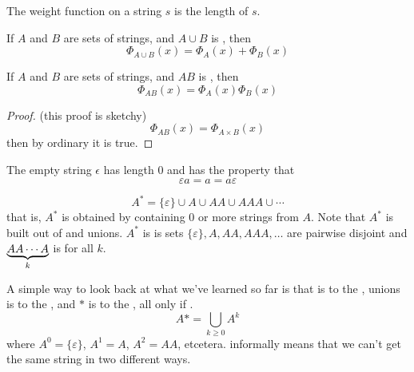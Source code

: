 \documentclass[english, 11pt]{article}
\begin{document}
\begin{exmp}
     \begin{defn}\label{weight function on strings}
     The weight function on a string $s$ is the length of $s$.
     \end{defn}

     \begin{thrm}\label{sum lemma on strings}
     If $A$ and $B$ are sets of strings, and $A \cup B$ is , then
     \[ \Phi_{A \cup B}(x) = \Phi_A(x) + \Phi_B(x) \]
     \end{thrm}

     \begin{thrm}\label{product lemma on strings}
     If $A$ and $B$ are sets of strings, and $AB$ is , then
     \[ \Phi_{AB}(x) = \Phi_A(x) \Phi_B(x) \]
     \end{thrm}
     \begin{proof}
       (this proof is sketchy)
       \[ \Phi_{AB}(x) = \Phi_{A \times B}(x) \]
       then by ordinary  it is true.
     \end{proof}
   \end{exmp}

   \begin{defn}\label{empty string}
   The empty string $\epsilon$ has length 0 and has the property that
   \[ \varepsilon a = a = a \varepsilon \]
   \end{defn}

   \begin{defn}[star]\label{star}
   \[ A^* = \{ \varepsilon \} \cup A \cup AA \cup AAA \cup \cdots \]
   that is, $A^*$ is obtained by containing 0 or more strings from $A$. Note that $A^*$ is built out of  and unions. $A^*$ is  is sets $\{\varepsilon\}, A, AA, AAA, \ldots$ are pairwise disjoint and $\underbrace{AA\cdots A}_k$ is  for all $k$.
   \end{defn}

   A simple way to look back at what we've learned so far is that  is to the , unions is to the , and $*$ is to the , all only if . \\

   \[ A* = \bigcup_{k \geq 0} A^k \]
   where $A^0 = \{ \varepsilon \}$, $A^1 = A$, $A^2 = AA$, etcetera.  informally means that we can't get the same string in two different ways.
\end{document}
